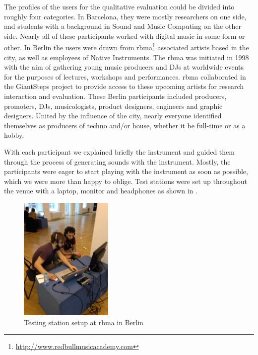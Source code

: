 The profiles of the users for the qualitative evaluation could be divided into roughly four categories. In Barcelona, they were mostly researchers on one side, and students with a background in Sound and Music Computing on the other side. Nearly all of these participants worked with digital music in some form or other. In Berlin the users were drawn from \acrfull{rbma}\footnote{\url{http://www.redbullmusicacademy.com}} associated artists based in the city, as well as employees of Native Instruments. The \acrshort{rbma} was initiated in 1998 with the aim of gathering young music producers and DJs at worldwide events for the purposes of lectures, workshops and performances. \acrshort{rbma} collaborated in the GiantSteps project \citep{Knees2015} to provide access to these upcoming artists for research interaction and evaluation. These Berlin participants included producers, promoters, DJs, musicologists, product designers, engineers and graphic designers. United by the influence of the city, nearly everyone identified themselves as producers of techno and/or house, whether it be full-time or as a hobby.

With each participant we explained briefly the instrument and guided them through the process of generating sounds with the instrument. Mostly, the participants were eager to start playing with the instrument as soon as possible, which we were more than happy to oblige. Test stations were set up throughout the venue with a laptop, monitor and headphones as shown in .

\begin{figure}
	\begin{center}
		\includegraphics[width=0.4\textwidth]{ch07_evaluation/figures/berlin.jpg}
	\end{center}
	\caption[Testing station setup at Red Bull Music Academy in Berlin]{Testing station setup at \acrshort{rbma} in Berlin}
	\label{fig:berlin}
\end{figure}

